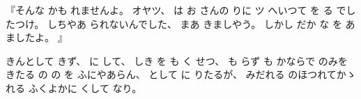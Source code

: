 『そんな
かも
れませんよ。
%
オヤツ、
%
は
お
さんの
りに
ツ
へいつて
を
る
でしたつけ。
%
しちやあ
られないんでした、
%
まあ
きましやう。
%
しかし
だか
な
を
あ
ましたよ。
』

きんとして
きず、
%
に
して、
%
しき
を
も
く
せつ、
%
も
らず
も
かならで
のみを
きたる
の
の
を
ふにやあらん、
%
として
に
りたるが、
%
みだれる
のほつれてかゝれる
ふくよかに
くして
なり。%
